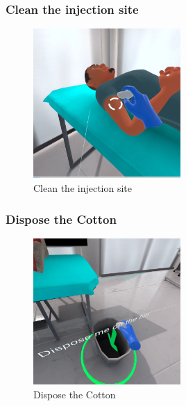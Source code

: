 \subsubsection{Clean the injection site}
\begin{figure}[h]
	\centering
	\includegraphics[width=0.5\textwidth, height=0.3\textheight]{Images/Clean the injection site.png}
	\caption{Clean the injection site}
	\label{fig:Clean the injection site}
\end{figure}

\subsubsection{Dispose the Cotton}
\begin{figure}[h]
	\centering
	\includegraphics[width=0.5\textwidth, height=0.3\textheight]{Images/Dispose the Cotton.png}
	\caption{Dispose the Cotton}
	\label{fig:Dispose the Cotton}
\end{figure}

